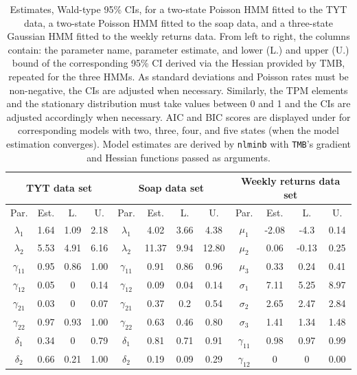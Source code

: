 \documentclass[]{interact}\usepackage[]{graphicx}\usepackage[dvipsnames]{xcolor}
\theoremstyle{plain}%
\theoremstyle{definition}
\theoremstyle{remark}
\begin{document}
\begin{table}[ht]
\centering
\caption{Estimates, Wald-type 95\% CIs, for a two-state Poisson HMM fitted to the TYT data, a two-state Poisson HMM fitted to the soap data, and a three-state Gaussian HMM fitted to the weekly returns data. From left to right, the columns contain: the parameter name, parameter estimate, and lower (L.) and upper (U.) bound of the corresponding 95\% CI derived via the Hessian provided by TMB, repeated for the three HMMs. As standard deviations and Poisson rates must be non-negative, the CIs are adjusted when necessary. Similarly, the TPM elements and the stationary distribution must take values between 0 and 1 and the CIs are adjusted accordingly when necessary. AIC and BIC scores are displayed under for corresponding models with two, three, four, and five states (when the model estimation converges). Model estimates are derived by \texttt{nlminb} with {\tt{TMB}}'s gradient and Hessian functions passed as arguments.} 
\label{tab:estimates-cis-aic-bic-real-data-part1}
\begin{tabular}{cccc|cccc|cccc}
  \multicolumn{4}{c}{TYT data set} & \multicolumn{4}{c}{Soap data set} & \multicolumn{4}{c}{Weekly returns data set} \\ \hline
Par. & Est. & L. & U. & Par. & Est. & L. & U. & Par. & Est. & L. & U. \\ 
  \hline
$\lambda_{1}$ & 1.64 & 1.09 & 2.18 & $\lambda_{1}$ & 4.02 & 3.66 & 4.38 & $\mu_{1}$ & -2.08 & -4.3 & 0.14 \\ 
  $\lambda_{2}$ & 5.53 & 4.91 & 6.16 & $\lambda_{2}$ & 11.37 & 9.94 & 12.80 & $\mu_{2}$ & 0.06 & -0.13 & 0.25 \\ 
  $\gamma_{11}$ & 0.95 & 0.86 & 1.00 & $\gamma_{11}$ & 0.91 & 0.86 & 0.96 & $\mu_{3}$ & 0.33 & 0.24 & 0.41 \\ 
  $\gamma_{12}$ & 0.05 & 0 & 0.14 & $\gamma_{12}$ & 0.09 & 0.04 & 0.14 & $\sigma_{1}$ & 7.11 & 5.25 & 8.97 \\ 
  $\gamma_{21}$ & 0.03 & 0 & 0.07 & $\gamma_{21}$ & 0.37 & 0.2 & 0.54 & $\sigma_{2}$ & 2.65 & 2.47 & 2.84 \\ 
  $\gamma_{22}$ & 0.97 & 0.93 & 1.00 & $\gamma_{22}$ & 0.63 & 0.46 & 0.80 & $\sigma_{3}$ & 1.41 & 1.34 & 1.48 \\ 
  $\delta_{1}$ & 0.34 & 0 & 0.79 & $\delta_{1}$ & 0.81 & 0.71 & 0.91 & $\gamma_{11}$ & 0.98 & 0.97 & 0.99 \\ 
  $\delta_{2}$ & 0.66 & 0.21 & 1.00 & $\delta_{2}$ & 0.19 & 0.09 & 0.29 & $\gamma_{12}$ & 0 & 0 & 0.00 \\ 

\end{tabular}
\end{table}
\end{document}
